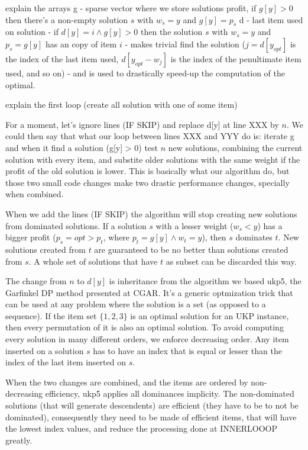 \documentclass[runningheads,a4paper]{llncs}
\begin{document}
explain the arrays
	g - sparse vector where we store solutions profit, if \(g[y] > 0\) then there's a non-empty solution \(s\) with \(w_s = y\) and \(g[y] = p_s\)
	d - last item used on solution - if \(d[y] = i \land g[y] > 0\) then the solution \(s\) with \(w_s = y\) and \(p_s = g[y]\) has an copy of item \(i\) - makes trivial find the solution (\(j = d[y_{opt}]\) is the index of the last item used, \(d[y_{opt} - w_j]\) is the index of the penultimate item used, and so on) - and is used to drastically speed-up the computation of the optimal.

explain the first loop (create all solution with one of some item)

For a moment, let's ignore lines (IF SKIP) and replace d[y] at line XXX by \(n\). We could then say that what our loop between lines XXX and YYY do is: iterate g and when it find a solution (g[y] > 0) test \(n\) new solutions, combining the current solution with every item, and substite older solutions with the same weight if the profit of the old solution is lower. This is basically what our algorithm do, but those two small code changes make two drastic performance changes, specially when combined. 

When we add the lines (IF SKIP) the algorithm will stop creating new solutions from dominated solutions. If a solution \(s\) with a lesser weight (\(w_s < y\)) has a bigger profit (\(p_s = opt > p_t\), where \(p_t = g[y] \land w_t = y\)), then \(s\) dominates \(t\). New solutions created from \(t\) are guaranteed to be no better than solutions created from \(s\). A whole set of solutions that have \(t\) as subset can be discarded this way.

The change from \(n\) to \(d[y]\) is inheritance from the algorithm we based ukp5, the Garfinkel DP method presented at CGAR. It's a generic optmization trick that can be used at any problem where the solution is a set (as opposed to a sequence). If the item set \(\{1, 2, 3\}\) is an optimal solution for an UKP instance, then every permutation of it is also an optimal solution. To avoid computing every solution in many different orders, we enforce decreasing order. Any item inserted on a solution \(s\) has to have an index that is equal or lesser than the index of the last item inserted on \(s\). 

When the two changes are combined, and the items are ordered by non-decreasing efficiency, ukp5 applies all dominances implicity. The non-dominated solutions (that will generate descendents) are efficient (they have to be to not be dominated), consequently they need to be made of efficient items, that will have the lowest index values, and reduce the processing done at INNERLOOOP greatly.
\end{document}
